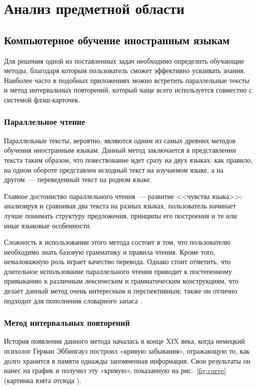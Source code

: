 \chapter{Анализ предметной области}
\label{cha:analysis}
\section{Компьютерное обучение иностранным языкам}

Для решения одной из поставленных задач необходимо определить обучающие методы, благодаря которым пользователь сможет эффективно усваивать знания. Наиболее часто в подобных приложениях можно встретить параллельные тексты и метод интервальных повторений, который чаще всего используется совместно с системой флэш-карточек.

\subsection{Параллельное чтение}

Параллельные тексты, вероятно, являются одним из самых древних методов обучения иностранным языкам. Данный метод заключается в представлении текста таким образом, что повествование идет сразу на двух языках: как правило, на одном обороте представлен исходный текст на изучаемом языке, а на другом~--- переведенный текст на родном языке.

Главное достоинство параллельного чтения~--- развитие <<чувства языка>>: анализируя и сравнивая два текста на разных языках, пользователь начинает лучше понимать структуру предложения, принципы его построения и те или иные языковые особенности.

Сложность в использовании этого метода состоит в том, что пользователю необходимо знать базовую грамматику и правила чтения. Кроме того, немаловажную роль играет качество перевода. Однако стоит отметить, что длительное использование параллельного чтения приводит к постепенному привыканию к различным лексическим и грамматическим конструкциям, что делает данный метод очень интересным и перспективным; также он отлично подходит для пополнения словарного запаса \cite{shepherd}.

\subsection{Метод интервальных повторений}

История появления данного метода началась в конце XIX века, когда немецкий психолог Герман Эббингауз построил «кривую забывания», отражающую то, как долго хранится в памяти однажды запомненная информация. Свои результаты он нанес на график и получил эту «кривую», показанную на рис.~\ref{fig:curve} (картинка взята отсюда \cite{picture}).

